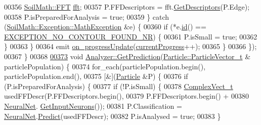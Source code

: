 \begin{DoxyCode}
00356             \hyperlink{class_soil_math_1_1_f_f_t}{SoilMath::FFT} \hyperlink{class_soil_analyzer_1_1_analyzer_a5a88bb8ae9ce9a8a1e199f3760f9db48}{fft};
00357             P.FFDescriptors = fft.\hyperlink{class_soil_math_1_1_f_f_t_af5fb6f4804079ee184a314e2f0a0f2fc}{GetDescriptors}(P.Edge);
00358             P.isPreparedForAnalysis = \textcolor{keyword}{true};
00359           \} \textcolor{keywordflow}{catch} (\hyperlink{class_soil_math_1_1_exception_1_1_math_exception}{SoilMath::Exception::MathException} &e) \{
00360             \textcolor{keywordflow}{if} (*e.\hyperlink{class_soil_math_1_1_exception_1_1_math_exception_aa8666225e202dd62eca2af0f826908be}{id}() == \hyperlink{_math_exception_8h_a3c2849e602d9d4c0dba3f2d3301d9cbf}{EXCEPTION\_NO\_CONTOUR\_FOUND\_NR}) \{
00361               P.isSmall = \textcolor{keyword}{true};
00362             \}
00363           \}
00364           emit \hyperlink{class_soil_analyzer_1_1_analyzer_a808a8c21029471c4af0be996cb67d14c}{on\_progressUpdate}(\hyperlink{class_soil_analyzer_1_1_analyzer_a068a9d419064799836bb8caff60a2141}{currentProgress}++);
00365         \}
00366       \});
00367 \}
00368 
\hypertarget{analyzer_8cpp_source_l00373}{}\hyperlink{class_soil_analyzer_1_1_analyzer_a7eb1a2676660f536b366f9aaf1326f80}{00373} \textcolor{keywordtype}{void} \hyperlink{class_soil_analyzer_1_1_analyzer_a7eb1a2676660f536b366f9aaf1326f80}{Analyzer::GetPrediction}(\hyperlink{class_soil_analyzer_1_1_particle_a4e43dab999d36d5a5f809bb4be5ff3a7}{Particle::ParticleVector\_t} &
      particlePopulation) \{
00374   for\_each(particlePopulation.begin(), particlePopulation.end(),
00375            [&](\hyperlink{class_soil_analyzer_1_1_particle}{Particle} &P) \{
00376              \textcolor{keywordflow}{if} (P.isPreparedForAnalysis) \{
00377                \textcolor{keywordflow}{if} (!P.isSmall) \{
00378                  \hyperlink{_soil_math_types_8h_a7567e521c2b2c408dcb62dbff72390f7}{ComplexVect\_t} usedFFDescr(P.FFDescriptors.begin(),
00379                                            P.FFDescriptors.begin() +
00380                                                \hyperlink{class_soil_analyzer_1_1_analyzer_a6ea3af4b49fef5b5f289bcc2046e615e}{NeuralNet}.
      \hyperlink{class_soil_math_1_1_n_n_a747371e8a53d1dd498e3f56c2ecece15}{GetInputNeurons}());
00381                  P.Classification = \hyperlink{class_soil_analyzer_1_1_analyzer_a6ea3af4b49fef5b5f289bcc2046e615e}{NeuralNet}.\hyperlink{class_soil_math_1_1_n_n_aa7f23fcdb8383a74586c9c30b8bc0af7}{Predict}(usedFFDescr);
00382                  P.isAnalysed = \textcolor{keyword}{true};
00383                \}

\end{DoxyCode}
